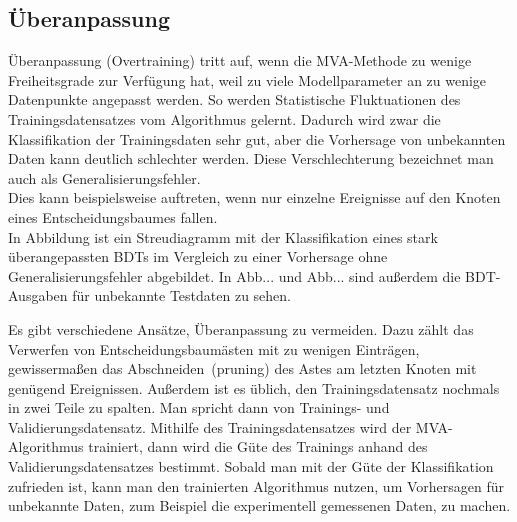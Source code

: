 

\subsection{\"Uberanpassung}
\label{ch:Algorithmen:subsec:overtraining}

\"Uberanpassung (Overtraining) tritt auf, wenn die MVA-Methode zu wenige Freiheitsgrade zur Verf\"ugung hat, weil zu viele Modellparameter an zu wenige Datenpunkte angepasst werden. So werden Statistische Fluktuationen des Trainingsdatensatzes vom Algorithmus gelernt. Dadurch wird zwar die Klassifikation der Trainingsdaten sehr gut, aber die Vorhersage von unbekannten Daten kann deutlich schlechter werden. Diese Verschlechterung bezeichnet man auch als Generalisierungsfehler.\\
Dies kann beispielsweise auftreten, wenn nur einzelne Ereignisse auf den Knoten eines Entscheidungsbaumes fallen.\\
In Abbildung  ist ein Streudiagramm mit der Klassifikation eines stark \"uberangepassten BDTs im Vergleich zu einer Vorhersage ohne Generalisierungsfehler abgebildet. In Abb... und Abb...  sind au\ss erdem die BDT-Ausgaben f\"ur unbekannte Testdaten zu sehen.

Es gibt verschiedene Ans\"atze, \"Uberanpassung zu vermeiden. Dazu z\"ahlt das Verwerfen von Entscheidungsbaum\"asten mit zu wenigen Eintr\"agen, gewisserma\ss en das \glqq Abschneiden\grqq~(pruning) des Astes am letzten Knoten mit gen\"ugend Ereignissen. Au\ss erdem ist es \"ublich, den Trainingsdatensatz nochmals in zwei Teile zu spalten. Man spricht dann von Trainings- und Validierungsdatensatz. Mithilfe des Trainingsdatensatzes wird der MVA-Algorithmus trainiert, dann wird die G\"ute des Trainings anhand des Validierungsdatensatzes bestimmt. Sobald man mit der G\"ute der Klassifikation zufrieden ist, kann man den trainierten Algorithmus nutzen, um Vorhersagen f\"ur unbekannte Daten, zum Beispiel die experimentell gemessenen Daten, zu machen.


